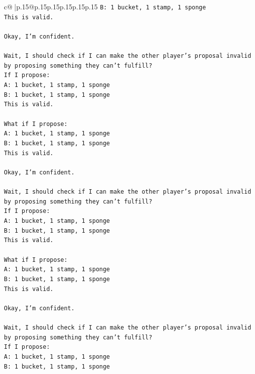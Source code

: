 \documentclass{article}
\begin{document}
{\begin{supertabular}{c@{$\;$}|p{.15\linewidth}@{}p{.15\linewidth}p{.15\linewidth}p{.15\linewidth}p{.15\linewidth}p{.15\linewidth}}
{{{\texttt{B: 1 bucket, 1 stamp, 1 sponge} \\
\texttt{This is valid.} \\
\\ 
\texttt{Okay, I'm confident.} \\
\\ 
\texttt{Wait, I should check if I can make the other player's proposal invalid by proposing something they can't fulfill?} \\
\texttt{If I propose:} \\
\texttt{A: 1 bucket, 1 stamp, 1 sponge} \\
\texttt{B: 1 bucket, 1 stamp, 1 sponge} \\
\texttt{This is valid.} \\
\\ 
\texttt{What if I propose:} \\
\texttt{A: 1 bucket, 1 stamp, 1 sponge} \\
\texttt{B: 1 bucket, 1 stamp, 1 sponge} \\
\texttt{This is valid.} \\
\\ 
\texttt{Okay, I'm confident.} \\
\\ 
\texttt{Wait, I should check if I can make the other player's proposal invalid by proposing something they can't fulfill?} \\
\texttt{If I propose:} \\
\texttt{A: 1 bucket, 1 stamp, 1 sponge} \\
\texttt{B: 1 bucket, 1 stamp, 1 sponge} \\
\texttt{This is valid.} \\
\\ 
\texttt{What if I propose:} \\
\texttt{A: 1 bucket, 1 stamp, 1 sponge} \\
\texttt{B: 1 bucket, 1 stamp, 1 sponge} \\
\texttt{This is valid.} \\
\\ 
\texttt{Okay, I'm confident.} \\
\\ 
\texttt{Wait, I should check if I can make the other player's proposal invalid by proposing something they can't fulfill?} \\
\texttt{If I propose:} \\
\texttt{A: 1 bucket, 1 stamp, 1 sponge} \\
\texttt{B: 1 bucket, 1 stamp, 1 sponge} \\
}}}
\end{supertabular}}
\end{document}
